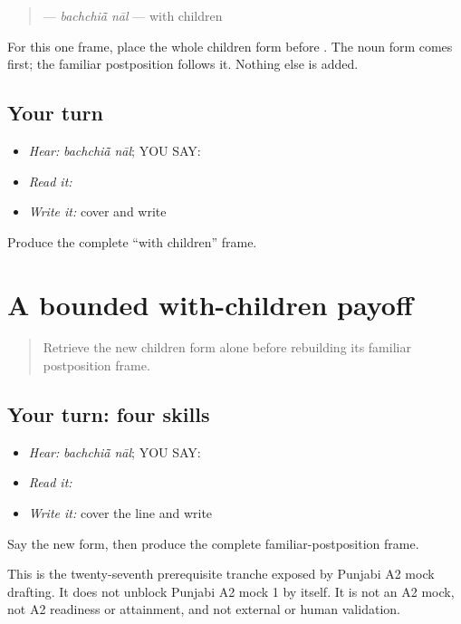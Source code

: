 \begin{grammarlens}[title={Grammar Lens}]
\begin{quote}
\textbf{ } — \emph{bachchiā̃ nāl} — with children
\end{quote}

For this one frame, place the whole children form before \textbf{}. The noun form comes first; the familiar postposition follows it. Nothing else is added.
\end{grammarlens}

\subsection*{Your turn}
\begin{itemize}
\raggedright
  \item \emph{Hear:} \emph{bachchiā̃ nāl}; YOU SAY: \textbf{ }
  \item \emph{Read it:} \textbf{ }
  \item \emph{Write it:} cover and write \textbf{ }
\end{itemize}

\begin{tcolorbox}[breakable,colback=teal!4,colframe=teal!35!black,title={Before you move on}]
Produce the complete “with children” frame.
\end{tcolorbox}
\section[\texorpdfstring{\pa{ਬੱਚਿਆਂ} \pa{ਨਾਲ} (bachchiaan naal)}{ਬੱਚਿਆਂ ਨਾਲ (bachchiaan naal)}]{A bounded with-children payoff}

\label{lesson:PA-C204-payoff}



\begin{quote}
Retrieve the new children form alone before rebuilding its familiar postposition frame.
\end{quote}

\subsection*{Your turn: four skills}
\begin{itemize}
\raggedright
  \item \emph{Hear:} \emph{bachchiā̃ nāl}; YOU SAY: \textbf{ }
  \item \emph{Read it:} \textbf{ }
  \item \emph{Write it:} cover the line and write \textbf{ }
\end{itemize}

\begin{tcolorbox}[breakable,colback=teal!4,colframe=teal!35!black,title={Before you move on}]
Say the new form, then produce the complete familiar-postposition frame.

This is the twenty-seventh prerequisite tranche exposed by Punjabi A2 mock drafting. It does not unblock Punjabi A2 mock 1 by itself. It is not an A2 mock, not A2 readiness or attainment, and not external or human validation.
\end{tcolorbox}
